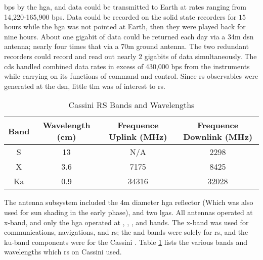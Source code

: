 \documentclass{article}
\begin{document}
                \gls{bps} by the \gls{hga}, and data could be
                transmitted to Earth at rates ranging from
                14,220-165,900 \gls{bps}. Data could be
                recorded on the solid state recorders for $15$
                hours while the \gls{hga} was not pointed at
                Earth, then they were played back for nine
                hours. About one gigabit of data could be
                returned each day via a 34m \gls{dsn}
                antenna; nearly four times that via a 70m
                ground antenna. The two redundant recorders
                could record and read out nearly 2 gigabits
                of data simultaneously. The \gls{cds} handled
                combined data rates in excess of 430,000
                \gls{bps} from the instruments while carrying
                on its functions of command and control.
                Since \gls{rs} observables were generated at
                the \gls{dsn}, little \gls{tlm} was of interest
                to \gls{rs}.
                \begin{table}[H]
                    \centering
                    \captionsetup{type=table}
                    \caption{Cassini RS Bands and Wavelengths}
                    \label{tab:usr_band_wav}
                    \footnotesize
                    \begin{tabular}{|c|c|c|c|}
                        \hline
                        Band&Wavelength (cm)
                        &Frequence Uplink (MHz)
                        &Frequence Downlink (MHz) \\
                        \hline
                        S&13& N/A&2298\\
                        X&3.6&7175&8425\\
                        Ka&0.9&34316&32028\\
                        \hline
                    \end{tabular}
                \end{table}
                The antenna subsystem included the 4m diameter
                \gls{hga} reflector (Which was also used for
                sun shading in the early
                 phase),
                and two \glspl{lga}. All antennas operated
                at \gls{x-band}, and only the \gls{hga}
                operated at ,
                , ,
                and  bands.
                The \gls{x-band} was used for communications,
                navigations, and \gls{rs};
                the  and
                 bands were solely for
                \gls{rs}, and the \gls{ku-band} components were
                for the Cassini .
                Table \ref{tab:usr_band_wav} lists the
                various bands and wavelengths which \gls{rs}
                on Cassini used.
\end{document}
